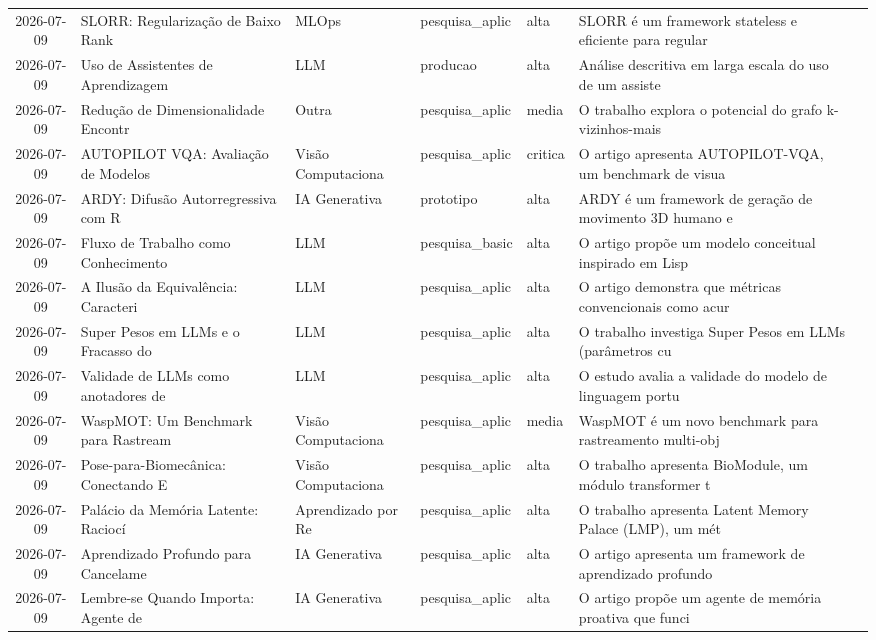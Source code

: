 \documentclass[
  brazilian,
  11pt,
  letterpaper,
  DIV=11,
  numbers=noendperiod]{scrartcl}
\begin{document}
\begin{table}
{\begin{threeparttable}
\begin{tabular}{cp{1.2cm}p{3.5cm}p{2cm}p{1.8cm}p{1.2cm}p{4cm}}
    2026-07-09 & SLORR: Regularização de Baixo Rank  & MLOps & pesquisa\_aplic & alta & SLORR é um framework stateless e eficiente para regular \\
    2026-07-09 & Uso de Assistentes de Aprendizagem  & LLM & producao & alta & Análise descritiva em larga escala do uso de um assiste \\
    2026-07-09 & Redução de Dimensionalidade Encontr & Outra & pesquisa\_aplic & media & O trabalho explora o potencial do grafo k-vizinhos-mais \\
    2026-07-09 & AUTOPILOT VQA: Avaliação de Modelos & Visão Computaciona & pesquisa\_aplic & critica & O artigo apresenta AUTOPILOT-VQA, um benchmark de visua \\
    2026-07-09 & ARDY: Difusão Autorregressiva com R & IA Generativa & prototipo & alta & ARDY é um framework de geração de movimento 3D humano e \\
    2026-07-09 & Fluxo de Trabalho como Conhecimento & LLM & pesquisa\_basic & alta & O artigo propõe um modelo conceitual inspirado em Lisp  \\
    2026-07-09 & A Ilusão da Equivalência: Caracteri & LLM & pesquisa\_aplic & alta & O artigo demonstra que métricas convencionais como acur \\
    2026-07-09 & Super Pesos em LLMs e o Fracasso do & LLM & pesquisa\_aplic & alta & O trabalho investiga Super Pesos em LLMs (parâmetros cu \\
    2026-07-09 & Validade de LLMs como anotadores de & LLM & pesquisa\_aplic & alta & O estudo avalia a validade do modelo de linguagem portu \\
    2026-07-09 & WaspMOT: Um Benchmark para Rastream & Visão Computaciona & pesquisa\_aplic & media & WaspMOT é um novo benchmark para rastreamento multi-obj \\
    2026-07-09 & Pose-para-Biomecânica: Conectando E & Visão Computaciona & pesquisa\_aplic & alta & O trabalho apresenta BioModule, um módulo transformer t \\
    2026-07-09 & Palácio da Memória Latente: Raciocí & Aprendizado por Re & pesquisa\_aplic & alta & O trabalho apresenta Latent Memory Palace (LMP), um mét \\
    2026-07-09 & Aprendizado Profundo para Cancelame & IA Generativa & pesquisa\_aplic & alta & O artigo apresenta um framework de aprendizado profundo \\
    2026-07-09 & Lembre-se Quando Importa: Agente de & IA Generativa & pesquisa\_aplic & alta & O artigo propõe um agente de memória proativa que funci \\

\end{tabular}
\end{threeparttable}}
\end{table}
\end{document}

